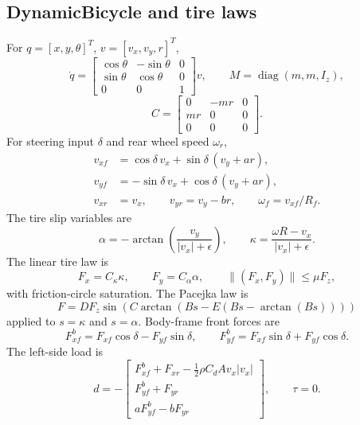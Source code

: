 \documentclass[11pt]{article}
\newcommand{\diag}{\operatorname{diag}}
\begin{document}
\subsection{DynamicBicycle and tire laws}
For \(q=[x,y,\theta]^T\), \(v=[v_x,v_y,r]^T\),
\begin{equation}
    \dot q =
    \begin{bmatrix}
        \cos\theta & -\sin\theta & 0\\
        \sin\theta & \cos\theta & 0\\
        0&0&1
    \end{bmatrix}v,
    \qquad
    M=\diag(m,m,I_z),
\end{equation}
\begin{equation}
    C =
    \begin{bmatrix}
        0&-mr&0\\
        mr&0&0\\
        0&0&0
    \end{bmatrix}.
\end{equation}
For steering input \(\delta\) and rear wheel speed \(\omega_r\),
\begin{align}
    v_{xf} &= \cos\delta\,v_x+\sin\delta\,(v_y+ar),\\
    v_{yf} &= -\sin\delta\,v_x+\cos\delta\,(v_y+ar),\\
    v_{xr} &= v_x,\qquad v_{yr}=v_y-br,\qquad
    \omega_f = v_{xf}/R_f.
\end{align}
The tire slip variables are
\begin{equation}
    \alpha=-\arctan\left(\frac{v_y}{|v_x|+\epsilon}\right),
    \qquad
    \kappa=\frac{\omega R-v_x}{|v_x|+\epsilon}.
\end{equation}
The linear tire law is
\begin{equation}
    F_x=C_\kappa\kappa,\qquad F_y=C_\alpha\alpha,
    \qquad
    \|(F_x,F_y)\|\leq \mu F_z,
\end{equation}
with friction-circle saturation.  The Pacejka law is
\begin{equation}
    F = D F_z \sin\left(C\arctan(Bs-E(Bs-\arctan(Bs)))\right)
\end{equation}
applied to \(s=\kappa\) and \(s=\alpha\).  Body-frame front forces are
\begin{equation}
    F_{xf}^{b}=F_{xf}\cos\delta-F_{yf}\sin\delta,
    \qquad
    F_{yf}^{b}=F_{xf}\sin\delta+F_{yf}\cos\delta.
\end{equation}
The left-side load is
\begin{equation}
    d=-
    \begin{bmatrix}
        F_{xf}^{b}+F_{xr}-\frac{1}{2}\rho C_dA v_x|v_x|\\
        F_{yf}^{b}+F_{yr}\\
        aF_{yf}^{b}-bF_{yr}
    \end{bmatrix},
    \qquad
    \tau=0.
\end{equation}
\end{document}
